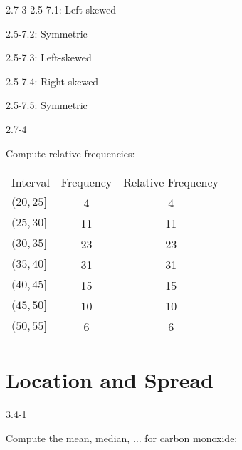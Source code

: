 \begin{exsol@solution}{2.7-3}
2.5-7.1: Left-skewed

2.5-7.2: Symmetric

2.5-7.3: Left-skewed

2.5-7.4: Right-skewed

2.5-7.5: Symmetric

\end{exsol@solution}
\begin{exsol@solution}{2.7-4}

Compute relative frequencies:

\begin{tabular}{@{} lcc @{}} \hline
Interval  &  Frequency &	Relative Frequency \\
$(20, 25]$ 	&     4 & 4  \\
$(25, 30]$ 	&    11 & 11 \\
$(30, 35]$ 	&    23 & 23 \\
$(35, 40]$ 	&    31 & 31 \\
$(40, 45]$ 	&    15 & 15 \\
$(45, 50]$ 	&    10 & 10 \\
$(50, 55]$ 	&     6 & 6 \\ \hline
\end{tabular}


\end{exsol@solution}
\setcounter{chapter}{3}\chapter{Location and Spread}
\begin{exsol@solution}{3.4-1}

	Compute the mean, median, $\dots$ for carbon monoxide:
\end{exsol@solution}

